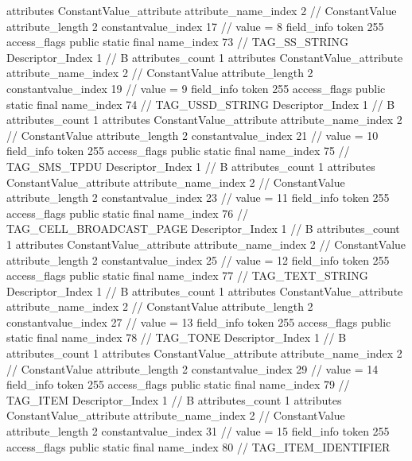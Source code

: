 {{{{{				attributes {
				ConstantValue_attribute {
					attribute_name_index	2		// ConstantValue
					attribute_length	2
					constantvalue_index	17		// value = 8
				}
				}
			}
			field_info {
				token	255
				access_flags	public static final
				name_index	73		// TAG_SS_STRING
				Descriptor_Index	1		// B
				attributes_count	1
				attributes {
				ConstantValue_attribute {
					attribute_name_index	2		// ConstantValue
					attribute_length	2
					constantvalue_index	19		// value = 9
				}
				}
			}
			field_info {
				token	255
				access_flags	public static final
				name_index	74		// TAG_USSD_STRING
				Descriptor_Index	1		// B
				attributes_count	1
				attributes {
				ConstantValue_attribute {
					attribute_name_index	2		// ConstantValue
					attribute_length	2
					constantvalue_index	21		// value = 10
				}
				}
			}
			field_info {
				token	255
				access_flags	public static final
				name_index	75		// TAG_SMS_TPDU
				Descriptor_Index	1		// B
				attributes_count	1
				attributes {
				ConstantValue_attribute {
					attribute_name_index	2		// ConstantValue
					attribute_length	2
					constantvalue_index	23		// value = 11
				}
				}
			}
			field_info {
				token	255
				access_flags	public static final
				name_index	76		// TAG_CELL_BROADCAST_PAGE
				Descriptor_Index	1		// B
				attributes_count	1
				attributes {
				ConstantValue_attribute {
					attribute_name_index	2		// ConstantValue
					attribute_length	2
					constantvalue_index	25		// value = 12
				}
				}
			}
			field_info {
				token	255
				access_flags	public static final
				name_index	77		// TAG_TEXT_STRING
				Descriptor_Index	1		// B
				attributes_count	1
				attributes {
				ConstantValue_attribute {
					attribute_name_index	2		// ConstantValue
					attribute_length	2
					constantvalue_index	27		// value = 13
				}
				}
			}
			field_info {
				token	255
				access_flags	public static final
				name_index	78		// TAG_TONE
				Descriptor_Index	1		// B
				attributes_count	1
				attributes {
				ConstantValue_attribute {
					attribute_name_index	2		// ConstantValue
					attribute_length	2
					constantvalue_index	29		// value = 14
				}
				}
			}
			field_info {
				token	255
				access_flags	public static final
				name_index	79		// TAG_ITEM
				Descriptor_Index	1		// B
				attributes_count	1
				attributes {
				ConstantValue_attribute {
					attribute_name_index	2		// ConstantValue
					attribute_length	2
					constantvalue_index	31		// value = 15
				}
				}
			}
			field_info {
				token	255
				access_flags	public static final
				name_index	80		// TAG_ITEM_IDENTIFIER
}}}}}
